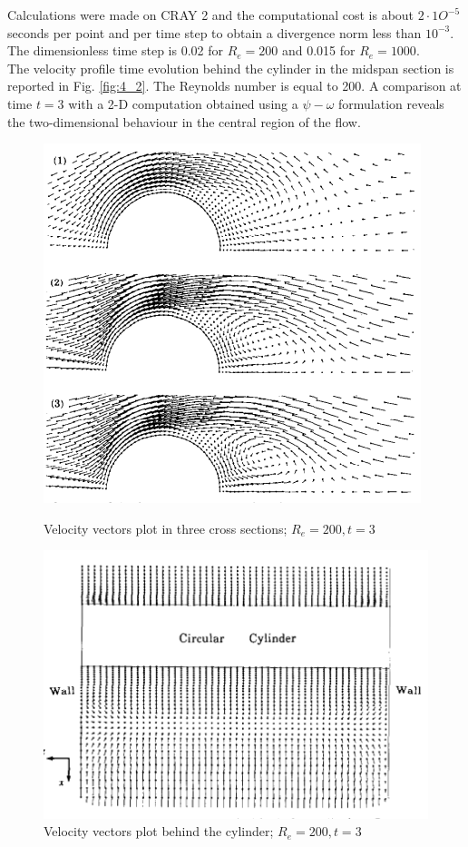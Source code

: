 \documentclass[11pt]{report}
\newcommand{\NI}{\noindent}
\begin{document}
	\NI Calculations were made on CRAY 2 and the computational cost is about $2 \cdot 1O^{-5}$ seconds per point and per time step to obtain a divergence norm less than $10^{-3}$. The dimensionless time step is 0.02 for $R_e = 200$ and 0.015 for $R_e = 1000$.\\
	The velocity profile time evolution behind the cylinder in the midspan section is reported in Fig. \ref{fig:4_2}. The Reynolds number is equal to 200. A comparison at time $t = 3$ with a 2-D computation obtained using a $\psi - \omega$ formulation reveals the two-dimensional behaviour in the central region of the flow.
	\begin{figure}[!h]
		\centering
		\begin{minipage}{.4\textwidth}
			\centering
			\includegraphics[width=1\linewidth]{graph_5}
			\caption{Velocity vectors plot in three cross sections; $R_e=200, t=3$}
			\label{fig:4_5}
		\end{minipage}
		\begin{minipage}{.4\textwidth}
			\centering
			\includegraphics[width=1.3\linewidth]{graph_6}
			\caption{Velocity vectors plot behind the cylinder; $R_e=200, t=3$}
			\label{fig:4_6}
		\end{minipage}
	\end{figure}
\end{document}

